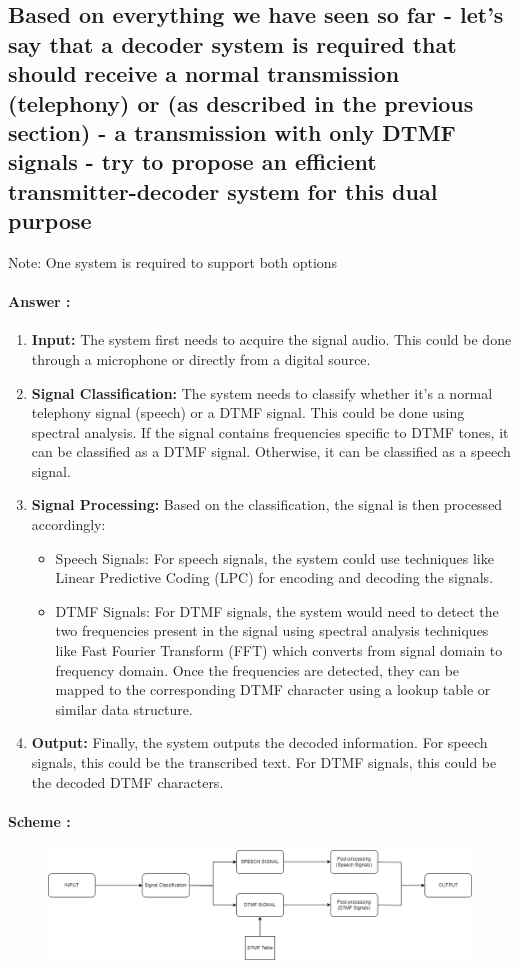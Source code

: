 \documentclass[letterpaper, 12pt]{article}
\begin{document}
\subsection{Based on everything we have seen so far - let's say that a decoder system is required that should receive a normal transmission (telephony) or (as described in the previous section) - a transmission with only DTMF signals - try to propose an efficient transmitter-decoder system for this dual purpose}
Note: One system is required to support both options

\paragraph{Answer :} 
\begin{enumerate}
    \item \textbf{Input:} The system first needs to acquire the signal audio. This could be done through a microphone or directly from a digital source.
    \item \textbf{Signal Classification:} The system needs to classify whether it’s a normal telephony signal (speech) or a DTMF signal. This could be done using spectral analysis. If the signal contains frequencies specific to DTMF tones, it can be classified as a DTMF signal. Otherwise, it can be classified as a speech signal.
    \item \textbf{Signal Processing:} Based on the classification, the signal is then processed accordingly:
    \begin{itemize}
    \item Speech Signals: For speech signals, the system could use techniques like Linear Predictive Coding (LPC) for encoding and decoding the signals.
    \item DTMF Signals: For DTMF signals, the system would need to detect the two frequencies present in the signal using spectral analysis techniques like Fast Fourier Transform (FFT) which converts from signal domain to frequency domain. Once the frequencies are detected, they can be mapped to the corresponding DTMF character using a lookup table or similar data structure.
    \end{itemize}
    \item \textbf{Output:} Finally, the system outputs the decoded information. For speech signals, this could be the transcribed text. For DTMF signals, this could be the decoded DTMF characters.
\end{enumerate}
\paragraph{Scheme :}
\begin{figure}[htbp]
    \centering
    \includegraphics[width=1\linewidth]{FINAL_ASSIGNMENT/A_S_6.png}
    
    
\end{figure}
\end{document}
